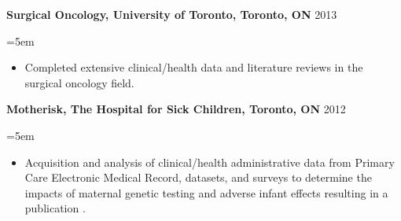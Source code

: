 \documentclass[paper=a4,fontsize=11pt]{scrartcl}	 			%
\newcommand{\NewPart}[1]{\section*{\uppercase{#1}}}
\newcommand{\EducationEntry}[4]{
		\noindent \textbf{#1} \hfill 					%
		\colorbox{White}{%
			\parbox{10em}{%
			\hfill\color{Black}#2}} \par				%
		\noindent \textit{#3} \par					%
		\noindent\hangindent=2em\hangafter=0 \small #4 	%
		\normalsize \par}
\newcommand{\WorkEntry}[4]{						%
		\noindent \textbf{#1} \hfill 					%
		\colorbox{White}{\color{Black}#2} \par		%
		\noindent \textit{#3} \par					%
		\noindent\hangindent=2em\hangafter=0 \small #4 	%
		\normalsize \par}
\newcommand{\WorkEntryG}[3]{						%
	\indent \indent \textbf{#1} \hfill 					%
	\colorbox{White}{\color{Black}#2} \par		%
	\hangindent=5em\hangafter=0 \small  #3 \par
	\normalsize }
\begin{document}
	\WorkEntryG{Surgical Oncology, University of Toronto, Toronto, ON}{2013}{
		\begin{itemize}
			\setlength{\itemindent}{0.2in}
		\item Completed extensive clinical/health data and literature reviews in the surgical oncology field.
		\end{itemize}}
	\sloppy\WorkEntryG{Motherisk, The Hospital for Sick Children, Toronto, ON}{2012}{
		\begin{itemize}
				\setlength{\itemindent}{0.2in}
		\item Acquisition and analysis of clinical/health administrative data from Primary Care Electronic Medical Record, datasets, and surveys to determine the impacts of maternal genetic testing and adverse infant effects resulting in a publication \cite{More:17}.
		\end{itemize}}

%
\end{document}
